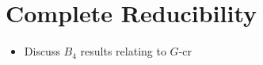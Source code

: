 
\chapter{Complete Reducibility}
\label{Chapter6}

\begin{itemize}
\item Discuss $B_4$ results relating to $G$-cr
\end{itemize}